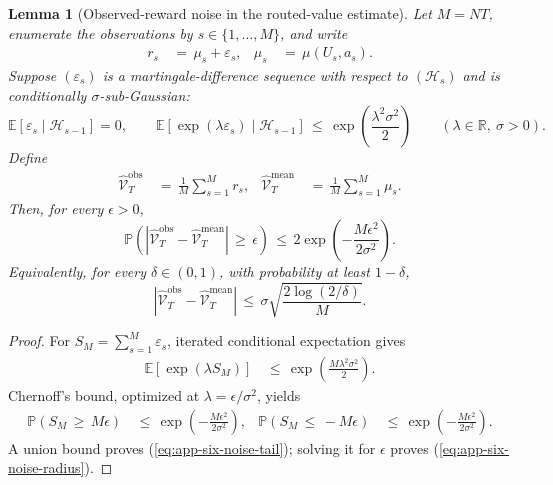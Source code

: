 \documentclass{article} %
\newtheorem{lemma}[theorem]{Lemma}
\renewcommand{\eqref}[1]{\textup{(\ref{#1})}}
\begin{document}
\begin{lemma}[Observed-reward noise in the routed-value estimate]
\label{lem:18}
Let \(M=NT\), enumerate the observations by \(s\in\{1,\ldots,M\}\), and
write
\begin{equation}
\begin{aligned}
r_s
&\,=\,
\mu_s+\varepsilon_s,
&
\mu_s
&\,=\,
\mu(U_s,a_s).
\end{aligned}
\end{equation}
Suppose \((\varepsilon_s)\) is a martingale-difference sequence with respect
to \((\mathcal H_s)\) and is conditionally \(\sigma\)-sub-Gaussian:
\begin{equation}
\label{eq:app-six-noise-subg}
\mathbb E[\varepsilon_s\mid\mathcal H_{s-1}]=0,
\qquad
\mathbb{E}\!\left[
\exp(\lambda\varepsilon_s)
\mid
\mathcal{H}_{s-1}
\right]
\,\le\,
\exp\!\left(\frac{\lambda^2\sigma^2}{2}\right)
\qquad(\lambda\in\mathbb R,\ \sigma>0).
\end{equation}
Define
\begin{equation}
\begin{aligned}
\widehat{\mathcal{V}}_{T}^{\mathrm{obs}}
&\,=\,
\frac{1}{M}\sum_{s=1}^{M}r_s,
&
\widehat{\mathcal{V}}_{T}^{\mathrm{mean}}
&\,=\,
\frac{1}{M}\sum_{s=1}^{M}\mu_s.
\end{aligned}
\end{equation}
Then, for every \(\epsilon>0\),
\begin{equation}
\label{eq:app-six-noise-tail}
\mathbb{P}\!\left(
\left|
\widehat{\mathcal{V}}_{T}^{\mathrm{obs}}
-
\widehat{\mathcal{V}}_{T}^{\mathrm{mean}}
\right|
\,\ge\,
\epsilon
\right)
\,\le\,
2\exp\!\left(
-\frac{M\epsilon^2}{2\sigma^2}
\right).
\end{equation}
Equivalently, for every \(\delta\in(0,1)\), with probability at least
\(1-\delta\),
\begin{equation}
\label{eq:app-six-noise-radius}
\left|
\widehat{\mathcal{V}}_{T}^{\mathrm{obs}}
-
\widehat{\mathcal{V}}_{T}^{\mathrm{mean}}
\right|
\,\le\,
\sigma\sqrt{\frac{2\log(2/\delta)}{M}}.
\end{equation}
\end{lemma}

\begin{proof}
For \(S_M=\sum_{s=1}^{M}\varepsilon_s\), iterated conditional expectation
gives
\begin{equation}
\begin{aligned}
\mathbb{E}\!\left[\exp(\lambda S_M)\right]
&\,\le\,
\exp\!\left(\frac{M\lambda^2\sigma^2}{2}\right).
\end{aligned}
\end{equation}
Chernoff's bound, optimized at \(\lambda=\epsilon/\sigma^2\), yields
\begin{equation}
\begin{aligned}
\mathbb{P}(S_M\,\ge\, M\epsilon)
&\,\le\,
\exp\!\left(-\frac{M\epsilon^2}{2\sigma^2}\right),
&
\mathbb{P}(S_M\,\le\, -M\epsilon)
&\,\le\,
\exp\!\left(-\frac{M\epsilon^2}{2\sigma^2}\right).
\end{aligned}
\end{equation}
A union bound proves \eqref{eq:app-six-noise-tail}; solving it for
\(\epsilon\) proves \eqref{eq:app-six-noise-radius}.
\end{proof}
\end{document}
